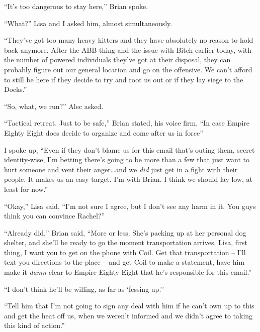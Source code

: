 





``It's too dangerous to stay here,'' Brian spoke.



``What?'' Lisa and I asked him, almost simultaneously.



``They've got too many heavy hitters and they have absolutely no reason to hold back anymore.  After the ABB thing and the issue with Bitch earlier today, with the number of powered individuals they've got at their disposal, they can probably figure out our general location and go on the offensive.  We can't afford to still be here if they decide to try and root us out or if they lay siege to the Docks.''



``So, what, we run?'' Alec asked.



``Tactical retreat.  Just to be safe,'' Brian stated, his voice firm, ``In case Empire Eighty Eight does decide to organize and come after us in force''



I spoke up, ``Even if they don't blame us for this email that's outing them, secret identity-wise, I'm betting there's going to be more than a few that just want to hurt someone and vent their anger\ldots and we \emph{did} just get in a fight with their people.  It makes us an easy target.  I'm with Brian.  I think we should lay low, at least for now.''



``Okay,'' Lisa said, ``I'm not sure I agree, but I don't see any harm in it.  You guys think you can convince Rachel?''



``Already did,'' Brian said, ``More or less.  She's packing up at her personal dog shelter, and she'll be ready to go the moment transportation arrives.  Lisa, first thing, I want you to get on the phone with Coil.  Get that transportation – I'll text you directions to the place – and get Coil to make a statement, have him make it \emph{damn} clear to Empire Eighty Eight that he's responsible for this email.''



``I don't think he'll be willing, as far as `fessing up.''



``Tell him that I'm not going to sign any deal with him if he can't own up to this and get the heat off us, when we weren't informed and we didn't agree to taking this kind of action.''



